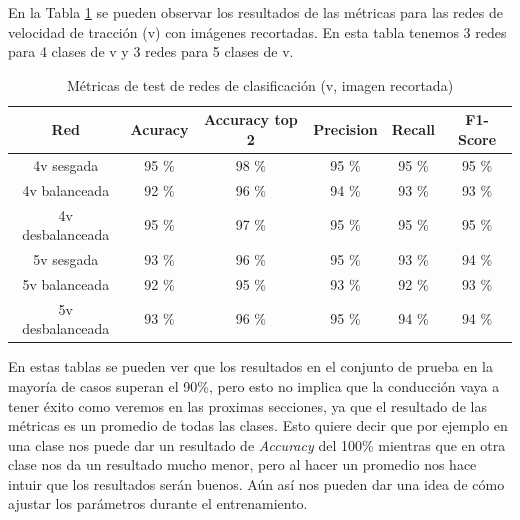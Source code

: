 En la Tabla \ref{metricas_classificacion_recortada_v} se pueden observar los resultados de las métricas para las redes de velocidad de tracción (v) con imágenes recortadas. En esta tabla tenemos 3 redes para 4 clases de v y 3 redes para 5 clases de v.\\

\begin{table}[H]
\centering
\caption{Métricas de test de redes de clasificación (v, imagen recortada)}
\label{metricas_classificacion_recortada_v}
\begin{tabular}{c|c|c|c|c|c|}
\cline{1-6}
                        \multicolumn{1}{|c|}{Red}    & Acuracy       & Accuracy top 2      & Precision       & Recall        & F1-Score        \\ \hline
\multicolumn{1}{|c|}{4v sesgada}    & 95 \%     & 98 \%         & 95 \%            & 95 \%          & 95 \%       \\ \hline
\multicolumn{1}{|c|}{4v balanceada}     & 92 \%        & 96 \%          &  94 \%              &  93 \%            &  93 \%             \\ \hline
\multicolumn{1}{|c|}{4v desbalanceada}      &  95 \%        & 97 \%           &  95 \%            & 95 \%        &  95 \%            \\ \hline
\multicolumn{1}{|c|}{5v sesgada}       & 93 \%         & 96 \%     & 95 \%            & 93 \%           & 94 \%              \\ \hline
\multicolumn{1}{|c|}{5v balanceada}      & 92 \%        & 95 \%         & 93 \%           & 92 \%     & 93 \%            \\ \hline
\multicolumn{1}{|c|}{5v desbalanceada}       & 93 \%          & 96 \%           & 95 \%          & 94 \%        & 94 \%               \\ \hline
\end{tabular}
\end{table}


En estas tablas se pueden ver que los resultados en el conjunto de prueba en la mayoría de casos superan el 90\%, pero esto no implica que la conducción vaya a tener éxito como veremos en las proximas secciones, ya que el resultado de las métricas es un promedio de todas las clases. Esto quiere decir que por ejemplo en una clase nos puede dar un resultado de \textit{Accuracy} del 100\% mientras que en otra clase nos da un resultado mucho menor, pero al hacer un promedio nos hace intuir que los resultados serán buenos. Aún así nos pueden dar una idea de cómo ajustar los parámetros durante el entrenamiento.\\


